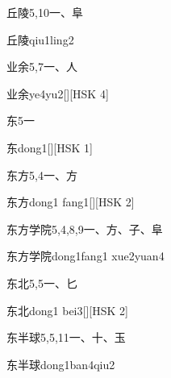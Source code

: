 \begin{entry}{丘陵}{5,10}{⼀、⾩}
  \begin{phonetics}{丘陵}{qiu1ling2}
  \end{phonetics}
\end{entry}

\begin{entry}{业余}{5,7}{⼀、⼈}
  \begin{phonetics}{业余}{ye4yu2}[][HSK 4]
  \end{phonetics}
\end{entry}

\begin{entry}{东}{5}{⼀}
  \begin{phonetics}{东}{dong1}[][HSK 1]
  \end{phonetics}
\end{entry}

\begin{entry}{东方}{5,4}{⼀、⽅}
  \begin{phonetics}{东方}{dong1 fang1}[][HSK 2]
  \end{phonetics}
\end{entry}

\begin{entry}{东方学院}{5,4,8,9}{⼀、⽅、⼦、⾩}
  \begin{phonetics}{东方学院}{dong1fang1 xue2yuan4}
  \end{phonetics}
\end{entry}

\begin{entry}{东北}{5,5}{⼀、⼔}
  \begin{phonetics}{东北}{dong1 bei3}[][HSK 2]
  \end{phonetics}
\end{entry}

\begin{entry}{东半球}{5,5,11}{⼀、⼗、⽟}
  \begin{phonetics}{东半球}{dong1ban4qiu2}
  \end{phonetics}
\end{entry}

